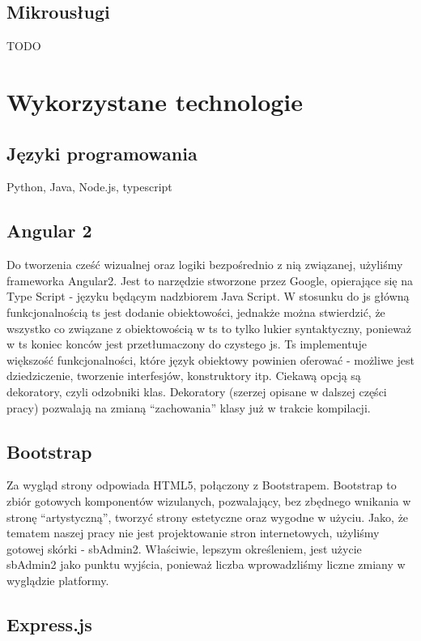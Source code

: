 \documentclass[licencjacka]{pracamgr}
\begin{document}
\section{Mikrousługi}
TODO

\chapter{Wykorzystane technologie}\label{r:tech}

\section{Języki programowania}
Python, Java, Node.js, typescript

\section{Angular 2}

Do tworzenia cześć wizualnej oraz logiki bezpośrednio z nią związanej, użyliśmy frameworka Angular2. Jest to narzędzie stworzone przez Google, opierające się
na Type Script - języku będącym nadzbiorem Java Script. W stosunku do js główną funkcjonalnością ts jest dodanie obiektowości, jednakże można stwierdzić,
że wszystko co związane z obiektowością w ts to tylko lukier syntaktyczny, ponieważ w ts koniec konców jest przetłumaczony do czystego js. Ts implementuje większość
funkcjonalności, które język obiektowy powinien oferować - możliwe jest dziedziczenie, tworzenie interfesjów, konstruktory itp. Ciekawą opcją są dekoratory, czyli
odzobniki klas. Dekoratory (szerzej opisane w dalszej części pracy) pozwalają na zmianą ``zachowania'' klasy już w trakcie kompilacji.

\section{Bootstrap}

Za wygląd strony odpowiada HTML5, połączony z Bootstrapem. Bootstrap to zbiór gotowych komponentów wizulanych, pozwalający, bez zbędnego wnikania
w stronę ``artystyczną'', tworzyć strony estetyczne oraz wygodne w użyciu. Jako, że tematem naszej pracy nie jest projektowanie stron internetowych,
użyliśmy gotowej skórki - sbAdmin2. Właściwie, lepszym określeniem, jest użycie sbAdmin2 jako punktu wyjścia, ponieważ liczba wprowadzliśmy
liczne zmiany w wyglądzie platformy.

\section{Express.js}
\end{document}
